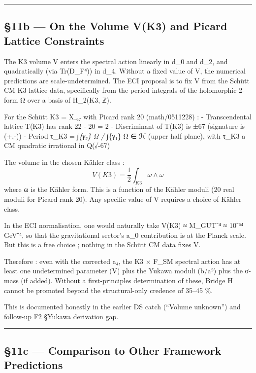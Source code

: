 \documentclass[
  11pt,
  a4paper,
]{article}
\begin{document}
\begin{center}\rule{0.5\linewidth}{0.5pt}\end{center}

\hypertarget{b-on-the-volume-vk3-and-picard-lattice-constraints}{%
\subsection{§11b --- On the Volume V(K3) and Picard Lattice Constraints}\label{b-on-the-volume-vk3-and-picard-lattice-constraints}}

The K3 volume V enters the spectral action linearly in d\_0 and d\_2, and quadratically (via Tr(D\_F⁴)) in d\_4. Without a fixed value of V, the numerical predictions are scale-undetermined. The ECI proposal is to fix V from the Schütt CM K3 lattice data, specifically from the period integrals of the holomorphic 2-form Ω over a basis of H\_2(K3, ℤ).

For the Schütt K3 = X₋₆₇ with Picard rank 20 (math/0511228) :
- Transcendental lattice T(K3) has rank 22 - 20 = 2
- Discriminant of T(K3) is ±67 (signature is (+,-))
- Period τ\_K3 = ∫\emph{\{γ₂\} Ω / ∫}\{γ₁\} Ω ∈ ℋ (upper half plane), with τ\_K3 a CM quadratic irrational in Q(√-67)

The volume in the chosen Kähler class :
\[
V(K3) = \frac{1}{2} \int_{K3} \omega \wedge \omega
\]
where ω is the Kähler form. This is a function of the Kähler moduli (20 real moduli for Picard rank 20). Any specific value of V requires a choice of Kähler class.

In the ECI normalisation, one would naturally take V(K3) ≈ M\_GUT⁻⁴ ≈ 10⁻⁶⁴ GeV⁻⁴, so that the gravitational sector's a\_0 contribution is at the Planck scale. But this is a free choice ; nothing in the Schütt CM data fixes V.

Therefore : even with the corrected a₄, the K3 × F\_SM spectral action has at least one undetermined parameter (V) plus the Yukawa moduli (b/a²) plus the σ-mass (if added). Without a first-principles determination of these, Bridge H cannot be promoted beyond the structural-only credence of 35--45 \%.

This is documented honestly in the earlier DS catch (``Volume unknown'') and follow-up F2 §Yukawa derivation gap.

\begin{center}\rule{0.5\linewidth}{0.5pt}\end{center}

\hypertarget{c-comparison-to-other-framework-predictions}{%
\subsection{§11c --- Comparison to Other Framework Predictions}\label{c-comparison-to-other-framework-predictions}}
\end{document}
